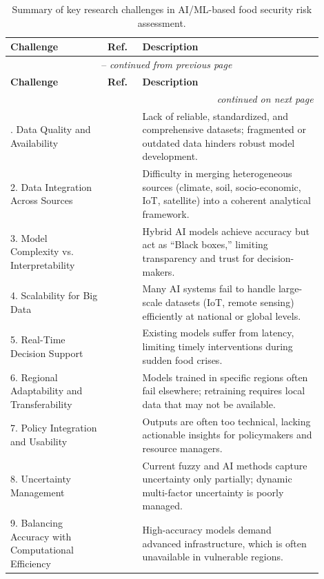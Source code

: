 \documentclass[preprint,12pt]{elsarticle}
\begin{document}
		
	\small
	\begin{longtable}{@{}p{0.28\linewidth}p{0.10\linewidth}p{0.52\linewidth}@{}}
		\caption{Summary of key research challenges in AI/ML-based food security risk assessment.}
		\label{tab:challenges} \\
		\toprule
		\textbf{Challenge} & \textbf{Ref.} & \textbf{Description} \\
		\midrule
		\endfirsthead
		\multicolumn{3}{c}{\tablename\ \thetable\ -- \textit{continued from previous page}} \\
		\toprule
		\textbf{Challenge} & \textbf{Ref.} & \textbf{Description} \\
		\midrule
		\endhead
		\midrule
		\multicolumn{3}{r}{\textit{continued on next page}} \\
		\endfoot
		\bottomrule
		\endlastfoot
		1. Data Quality and Availability & \cite{ref61} & Lack of reliable, standardized, and comprehensive datasets; fragmented or outdated data hinders robust model development. \\
		2. Data Integration Across Sources & \cite{ref62} & Difficulty in merging heterogeneous sources (climate, soil, socio-economic, IoT, satellite) into a coherent analytical framework. \\
		3. Model Complexity vs. Interpretability & \cite{ref9,ref4} & Hybrid AI models achieve accuracy but act as ``Black boxes,'' limiting transparency and trust for decision-makers. \\
		4. Scalability for Big Data & \cite{ref11} & Many AI systems fail to handle large-scale datasets (IoT, remote sensing) efficiently at national or global levels. \\
		5. Real-Time Decision Support & \cite{ref63} & Existing models suffer from latency, limiting timely interventions during sudden food crises. \\
		6. Regional Adaptability and Transferability & \cite{ref11} & Models trained in specific regions often fail elsewhere; retraining requires local data that may not be available. \\
		7. Policy Integration and Usability & \cite{ref4,ref63} & Outputs are often too technical, lacking actionable insights for policymakers and resource managers. \\
		8. Uncertainty Management & \cite{ref9,ref4} & Current fuzzy and AI methods capture uncertainty only partially; dynamic multi-factor uncertainty is poorly managed. \\
		9. Balancing Accuracy with Computational Efficiency & \cite{ref62,ref63} & High-accuracy models demand advanced infrastructure, which is often unavailable in vulnerable regions. \\

\end{longtable}
\end{document}
